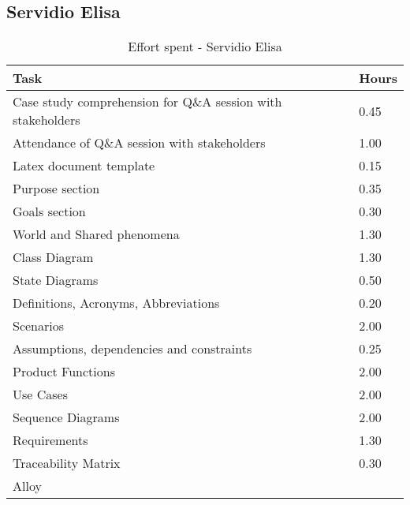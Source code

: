 \subsection{Servidio Elisa}
\renewcommand{\arraystretch}{2}
\begin{longtable}{|m{9cm}|m{1.2cm}|}
\caption{Effort spent - Servidio Elisa}\\
\hline
\endfirsthead
\endhead
\hline
\endlastfoot
\rowcolor{green2}
\textbf{Task} &\hfil {\textbf{Hours}}\\
\hline
Case study comprehension for Q\&A session with stakeholders & \hfil 0.45\\
Attendance of Q\&A session with stakeholders & \hfil 1.00\\
Latex document template & \hfil 0.15\\
Purpose section	& \hfil 0.35\\
Goals section & \hfil 0.30\\
World and Shared phenomena & \hfil 1.30\\
Class Diagram & \hfil 1.30\\
State Diagrams & \hfil 0.50\\
Definitions, Acronyms, Abbreviations & \hfil 0.20\\
Scenarios & \hfil 2.00\\
Assumptions, dependencies and constraints & \hfil 0.25\\
Product Functions & \hfil 2.00\\
Use Cases & \hfil 2.00\\
Sequence Diagrams & \hfil 2.00\\
Requirements & \hfil 1.30\\
Traceability Matrix & \hfil 0.30\\
Alloy & \hfil \\
\hline
\end{longtable}


